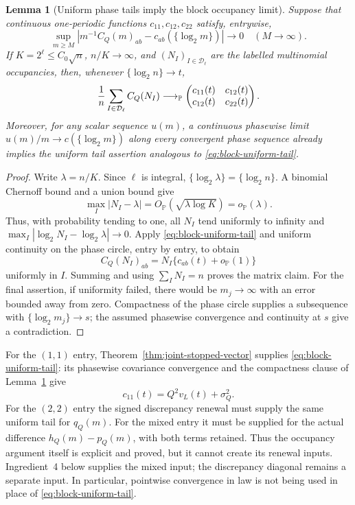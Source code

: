 \documentclass[11pt]{article}
\numberwithin{equation}{section}
\newtheorem{lemma}[theorem]{Lemma}
\newcommand{\1}{\mathbf 1}\newcommand{\F}{\mathcal F}\newcommand{\D}{\mathcal D}
\begin{document}
\begin{lemma}[Uniform phase tails imply the block occupancy limit]
\label{lem:block-occupancy-transfer}
Suppose that continuous one-periodic functions $c_{11},c_{12},c_{22}$
satisfy, entrywise,
\begin{equation}
 \sup_{m\ge M}\left|m^{-1}C_Q(m)_{ab}
 -c_{ab}(\{\log _2m\})\right|\longrightarrow0
 \quad(M\to\infty).                                  \label{eq:block-uniform-tail}
\end{equation}
If $K=2^\ell\le C_0\sqrt n$, $n/K\to\infty$, and
$(N_I)_{I\in\mathcal D_\ell}$ are the labelled multinomial occupancies,
then, whenever $\{\log _2n\}\to t$,
\[
 {1\over n}\sum_{I\in\mathcal D_\ell}C_Q(N_I)
 \longrightarrow_{\mathbb P}
 \begin{pmatrix}c_{11}(t)&c_{12}(t)\\c_{12}(t)&c_{22}(t)\end{pmatrix}.
\]
Moreover, for any scalar sequence $u(m)$, a continuous phasewise limit
$u(m)/m\to c(\{\log _2m\})$ along every convergent phase sequence already
implies the uniform tail assertion analogous to
\eqref{eq:block-uniform-tail}.
\end{lemma}
\begin{proof}
Write $\lambda=n/K$.  Since $\ell$ is integral,
$\{\log _2\lambda\}=\{\log _2n\}$.  A binomial Chernoff bound and a union
bound give
\[
 \max_I|N_I-\lambda|=O_{\mathbb P}(\sqrt{\lambda\log K})
 =o_{\mathbb P}(\lambda).
\]
Thus, with probability tending to one, all $N_I$ tend uniformly to infinity
and
$\max_I|\log _2N_I-\log _2\lambda|\to0$.  Apply
\eqref{eq:block-uniform-tail} and uniform continuity on the phase circle,
entry by entry, to obtain
\[
 C_Q(N_I)_{ab}=N_I\{c_{ab}(t)+o_{\mathbb P}(1)\}
\]
uniformly in $I$.  Summing and using $\sum_I N_I=n$ proves the matrix
claim.  For the final assertion, if uniformity failed, there would be
$m_j\to\infty$ with an error bounded away from zero.  Compactness of the
phase circle supplies a subsequence with $\{\log _2m_j\}\to s$; the assumed
phasewise convergence and continuity at $s$ give a contradiction.
\end{proof}

For the $(1,1)$ entry, Theorem~\ref{thm:joint-stopped-vector} supplies
\eqref{eq:block-uniform-tail}: its phasewise covariance convergence and the
compactness clause of Lemma~\ref{lem:block-occupancy-transfer} give
\[
 c_{11}(t)=Q^2v_L(t)+\sigma_Q^2.
\]
For the $(2,2)$ entry the signed discrepancy renewal must supply the same
uniform tail for $q_Q(m)$.  For the mixed entry it must be supplied for the
actual difference $h_Q(m)-p_Q(m)$, with both terms retained.  Thus the
occupancy argument itself is explicit and proved, but it cannot create its
renewal inputs.  Ingredient~4 below supplies the mixed input; the discrepancy
diagonal remains a separate input.  In particular, pointwise convergence in
law is not being used in place of \eqref{eq:block-uniform-tail}.
\end{document}
